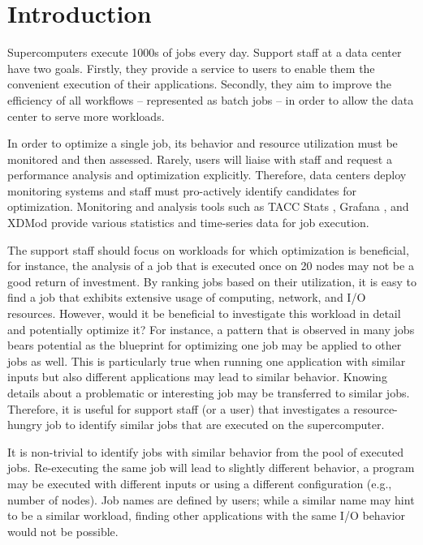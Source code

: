 \documentclass{jhps}
\begin{document}
\section{Introduction}

Supercomputers execute 1000s of jobs every day.
Support staff at a data center have two goals.
Firstly, they provide a service to users to enable them the convenient execution of their applications.
Secondly, they aim to improve the efficiency of all workflows -- represented as batch jobs -- in order to allow the data center to serve more workloads.

In order to optimize a single job, its behavior and resource utilization must be monitored and then assessed.
Rarely, users will liaise with staff and request a performance analysis and optimization explicitly.
Therefore, data centers deploy monitoring systems and staff must pro-actively identify candidates for optimization.
Monitoring and analysis tools such as TACC Stats \cite{evans2014comprehensive}, Grafana \cite{chan2019resource}, and XDMod \cite{simakov2018workload} provide various statistics and time-series data for job execution.

The support staff should focus on workloads for which optimization is beneficial, for instance, the analysis of a job that is executed once on 20 nodes may not be a good return of investment.
By ranking jobs based on their utilization, it is easy to find a job that exhibits extensive usage of computing, network, and I/O resources.
However, would it be beneficial to investigate this workload in detail and potentially optimize it?
For instance, a pattern that is observed in many jobs bears potential as the blueprint for optimizing one job may be applied to other jobs as well.
This is particularly true when running one application with similar inputs but also different applications may lead to similar behavior.
Knowing details about a problematic or interesting job may be transferred to similar jobs.
Therefore, it is useful for support staff (or a user) that investigates a resource-hungry job to identify similar jobs that are executed on the supercomputer.

It is non-trivial to identify jobs with similar behavior from the pool of executed jobs.
Re-executing the same job will lead to slightly different behavior, a program may be executed with different inputs or using a different configuration (e.g., number of nodes).
Job names are defined by users; while a similar name may hint to be a similar workload, finding other applications with the same I/O behavior would not be possible.
\end{document}
